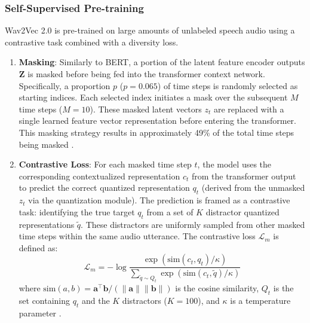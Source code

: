\subsubsection{Self-Supervised Pre-training}

Wav2Vec 2.0 is pre-trained on large amounts of unlabeled speech audio using a contrastive task combined with a diversity loss.

\begin{enumerate}
    \item \textbf{Masking}: Similarly to BERT, a portion of the latent feature encoder outputs \( \mathbf{Z} \) is masked before being fed into the transformer context network. Specifically, a proportion \( p \) (\( p=0.065 \)) of time steps is randomly selected as starting indices. Each selected index initiates a mask over the subsequent \( M \) time steps (\( M=10 \)). These masked latent vectors \( z_t \) are replaced with a single learned feature vector representation before entering the transformer. This masking strategy results in approximately 49\% of the total time steps being masked \cite{baevski2020wav2vec20frameworkselfsupervised}.

    \item \textbf{Contrastive Loss}: For each masked time step \( t \), the model uses the corresponding contextualized representation \( c_t \) from the transformer output to predict the correct quantized representation \( q_t \) (derived from the unmasked \( z_t \) via the quantization module). The prediction is framed as a contrastive task: identifying the true target \( q_t \) from a set of \( K \) distractor quantized representations \( \tilde{q} \). These distractors are uniformly sampled from other masked time steps within the same audio utterance. The contrastive loss \( \mathcal{L}_m \) is defined as:
    \begin{equation} \label{eq:contrastive_loss}
        \mathcal{L}_m = -\log \frac{\exp(\text{sim}(c_t, q_t)/\kappa)}{\sum_{\tilde{q} \sim Q_t} \exp(\text{sim}(c_t, \tilde{q})/\kappa)}
    \end{equation}
    where \( \text{sim}(a, b) = \mathbf{a}^\top \mathbf{b} / (\|\mathbf{a}\| \|\mathbf{b}\|) \) is the cosine similarity, \( Q_t \) is the set containing \( q_t \) and the \( K \) distractors (\(K=100\)), and \( \kappa \) is a temperature parameter \cite{baevski2020wav2vec20frameworkselfsupervised}.


\end{enumerate}
